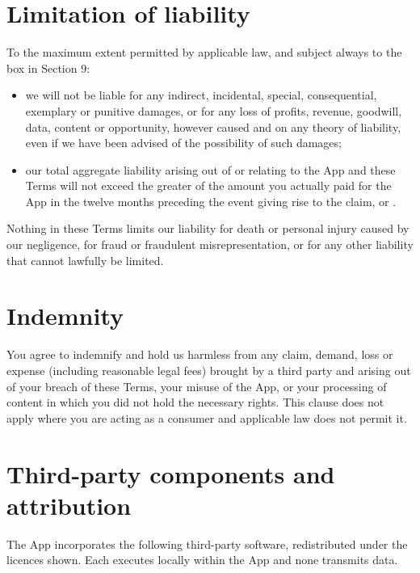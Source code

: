\documentclass[11pt]{article}
\begin{document}
\section{Limitation of liability}

To the maximum extent permitted by applicable law, and subject always to the box in
Section 9:

\begin{itemize}
  \item we will not be liable for any indirect, incidental, special, consequential,
        exemplary or punitive damages, or for any loss of profits, revenue, goodwill,
        data, content or opportunity, however caused and on any theory of liability,
        even if we have been advised of the possibility of such damages;
  \item our total aggregate liability arising out of or relating to the App and these
        Terms will not exceed the greater of the amount you actually paid for the App
        in the twelve months preceding the event giving rise to the claim, or
        .
\end{itemize}

Nothing in these Terms limits our liability for death or personal injury caused by our
negligence, for fraud or fraudulent misrepresentation, or for any other liability that
cannot lawfully be limited.

\section{Indemnity}

You agree to indemnify and hold us harmless from any claim, demand, loss or expense
(including reasonable legal fees) brought by a third party and arising out of your
breach of these Terms, your misuse of the App, or your processing of content in which
you did not hold the necessary rights. This clause does not apply where you are acting
as a consumer and applicable law does not permit it.

\section{Third-party components and attribution}

The App incorporates the following third-party software, redistributed under the
licences shown. Each executes locally within the App and none transmits data.
\end{document}
